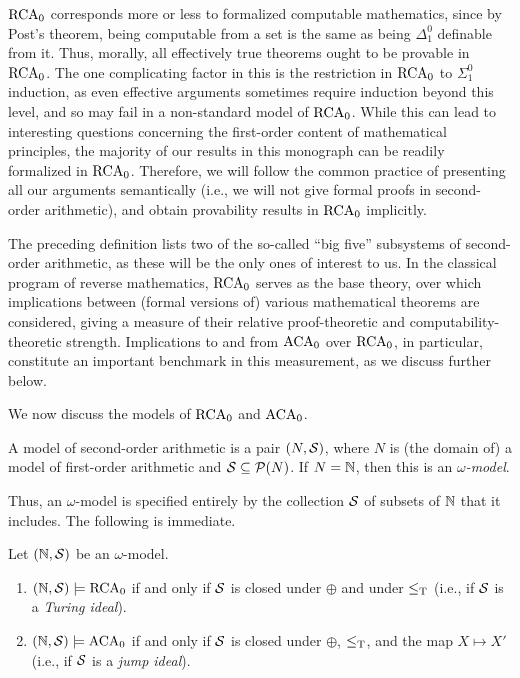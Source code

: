 $\mathrm{RCA}_0$ corresponds more or less to formalized computable mathematics, since by Post's theorem, being computable from a set is the same as being $\Delta^0_1$ definable from it. Thus, morally, all effectively true theorems ought to be provable in $\mathrm{RCA}_0$. The one complicating factor in this is the restriction in $\mathrm{RCA}_0$ to $\Sigma^0_1$ induction, as even effective arguments sometimes require induction beyond this level, and so may fail in a non-standard model of $\mathrm{RCA}_0$. While this can lead to interesting questions concerning the first-order content of mathematical principles, the majority of our results in this monograph can be readily formalized in $\mathrm{RCA}_0$. Therefore, we will follow the common practice of presenting all our arguments semantically (i.e., we will not give formal proofs in second-order arithmetic), and obtain provability results in $\mathrm{RCA}_0$ implicitly.

The preceding definition lists two of the so-called ``big five'' subsystems of second-order arithmetic, as these will be the only ones of interest to us. In the classical program of reverse mathematics, $\mathrm{RCA}_0$ serves as the base theory, over which implications between (formal versions of) various mathematical theorems are considered, giving a measure of their relative proof-theoretic and computability-theoretic strength. Implications to and from $\mathrm{ACA}_0$ over $\mathrm{RCA}_0$, in particular, constitute an important benchmark in this measurement, as we discuss further below.

We now discuss the models of $\mathrm{RCA}_0$ and $\mathrm{ACA}_0$.

\begin{definition}
	A model of second-order arithmetic is a pair $(N,\mathcal{S})$, where $N$ is (the domain of) a model of first-order arithmetic and $\mathcal{S} \subseteq \mathcal{P}(N)$. If $N = \mathbb{N}$, then this is an \emph{$\omega$-model}. 
\end{definition}

\noindent Thus, an $\omega$-model is specified entirely by the collection $\mathcal{S}$ of subsets of $\mathbb{N}$ that it includes. The following is immediate.

\begin{lemma}
	Let $(\mathbb{N},\mathcal{S})$ be an $\omega$-model.
	\begin{enumerate}
		\item $(\mathbb{N},\mathcal{S}) \models \mathrm{RCA}_0$ if and only if $\mathcal{S}$ is closed under $\oplus$ and under $\leq_{\text{\upshape T}}$ (i.e., if $\mathcal{S}$ is a \emph{Turing ideal}).
		\item $(\mathbb{N},\mathcal{S}) \models \mathrm{ACA}_0$ if and only if $\mathcal{S}$ is closed under $\oplus$, $\leq_{\text{\upshape T}}$, and the map $X \mapsto X'$ (i.e., if $\mathcal{S}$ is a \emph{jump ideal}).
	\end{enumerate}	
\end{lemma}

